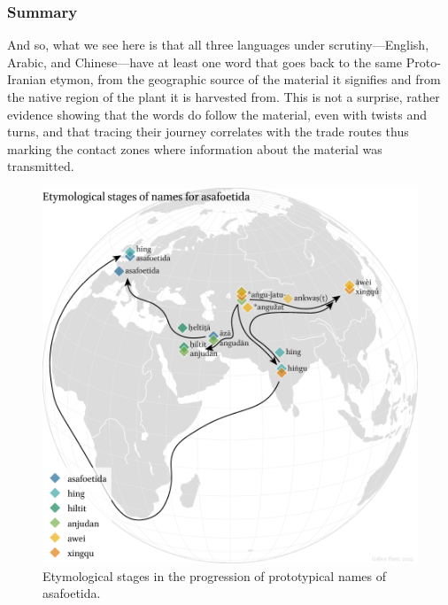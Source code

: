 


\subsubsection{Summary}

And so, what we see here is that all three languages under scrutiny---English, Arabic, and Chinese---have at least one word that goes back to the same Proto-Iranian etymon, from the geographic source of the material it signifies and from the native region of the plant it is harvested from. This is not a surprise, rather evidence showing that the words do follow the material, even with twists and turns, and that tracing their journey correlates with the trade routes thus marking the contact zones where information about the material was transmitted.



\begin{figure}[ht]
    \centering
    \includegraphics[width=\textwidth]{imgs/plots/diffusion_asafoetida_edited.pdf}
    \caption{Etymological stages in the progression of prototypical names of asafoetida.}
    \label{fig:cardamom_stages}
\end{figure}






